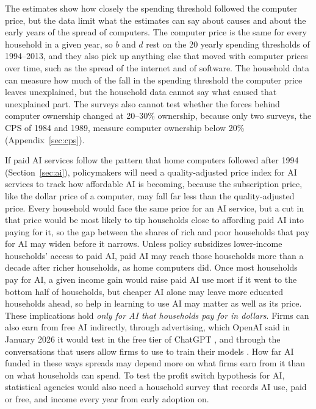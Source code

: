 \documentclass[11pt]{article}
\begin{document}
The estimates show how closely the spending threshold followed the computer price, but the data limit what the estimates can say about causes and about the early years of the spread of computers. The computer price is the same for every household in a given year, so $b$ and $d$ rest on the 20 yearly spending thresholds of 1994--2013, and they also pick up anything else that moved with computer prices over time, such as the spread of the internet and of software. The household data can measure how much of the fall in the spending threshold the computer price leaves unexplained, but the household data cannot say what caused that unexplained part. The surveys also cannot test whether the forces behind computer ownership changed at 20--30\% ownership, because only two surveys, the CPS of 1984 and 1989, measure computer ownership below 20\% (Appendix~\ref{sec:cps}).

If paid AI services follow the pattern that home computers followed after 1994 (Section~\ref{sec:ai}), policymakers will need a quality-adjusted price index for AI services to track how affordable AI is becoming, because the subscription price, like the dollar price of a computer, may fall far less than the quality-adjusted price. Every household would face the same price for an AI service, but a cut in that price would be most likely to tip households close to affording paid AI into paying for it, so the gap between the shares of rich and poor households that pay for AI may widen before it narrows. Unless policy subsidizes lower-income households' access to paid AI, paid AI may reach those households more than a decade after richer households, as home computers did. Once most households pay for AI, a given income gain would raise paid AI use most if it went to the bottom half of households, but cheaper AI alone may leave more educated households ahead, so help in learning to use AI may matter as well as its price. These implications hold \emph{only for AI that households pay for in dollars}. Firms can also earn from free AI indirectly, through advertising, which OpenAI said in January 2026 it would test in the free tier of ChatGPT \citep{openai2026}, and through the conversations that users allow firms to use to train their models \citep{anthropic2025}. How far AI funded in these ways spreads may depend more on what firms earn from it than on what households can spend. To test the profit switch hypothesis for AI, statistical agencies would also need a household survey that records AI use, paid or free, and income every year from early adoption on.
\end{document}
